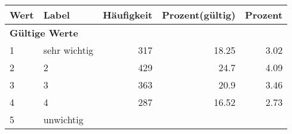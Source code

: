      \begin{longtable}{lXrrr}
     \toprule
     \textbf{Wert} & \textbf{Label} & \textbf{Häufigkeit} & \textbf{Prozent(gültig)} & \textbf{Prozent} \\
     \endhead
     \midrule
     \multicolumn{5}{l}{\textbf{Gültige Werte}}\\

     1 &
     \multicolumn{1}{X}{ sehr wichtig   } &


       \num{317} &
       \num[round-mode=places,round-precision=2]{18.25} &
         \num[round-mode=places,round-precision=2]{3.02} \\

     2 &
     \multicolumn{1}{X}{ 2   } &


       \num{429} &
       \num[round-mode=places,round-precision=2]{24.7} &
         \num[round-mode=places,round-precision=2]{4.09} \\

     3 &
     \multicolumn{1}{X}{ 3   } &


       \num{363} &
       \num[round-mode=places,round-precision=2]{20.9} &
         \num[round-mode=places,round-precision=2]{3.46} \\

     4 &
     \multicolumn{1}{X}{ 4   } &


       \num{287} &
       \num[round-mode=places,round-precision=2]{16.52} &
         \num[round-mode=places,round-precision=2]{2.73} \\

     5 &
     \multicolumn{1}{X}{ unwichtig   } &



\end{longtable}
